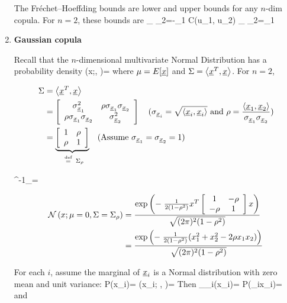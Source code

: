 \begin{enumerate}
The Fréchet–Hoeffding bounds
are lower and upper bounds
for any $n$-dim copula.
For $n=2$, these bounds are
\beq
{}_
{\rvx_2=-\alp \rvx_1}
\leq C(u_1, u_2)\leq
{}_{
\rvx_2=\alp\rvx_1}
\eeq

\item {\bf Gaussian copula}

Recall that the $n$-dimensional
multivariate Normal Distribution
has a probability density
\beq
\caln(x;\mu, \Sigma)=
{}
\eeq
where $\mu= E[{\underline{x}}]$ and
$\Sigma = \left\langle{\underline{x}}^T, {\underline{x}}\right\rangle$.
For $n=2$,

\begin{align}
\Sigma&=
\left\langle{\underline{x}}^T, {\underline{x}}\right\rangle
\\
&=
\left[
\begin{array}{cc}
\sigma_{{\underline{x}}_1}^2
&\rho \sigma_{{\underline{x}}_1}\sigma_{{\underline{x}}_2}
\\
\rho \sigma_{{\underline{x}}_1}\sigma_{{\underline{x}}_2}
&\sigma_{{\underline{x}}_2}^2
\end{array}
\right]
\quad (\sigma_{{\underline{x}}_i} = \sqrt{\left\langle{\underline{x}}_i, {\underline{x}}_i\right\rangle}
\text{ and } \rho  = \frac{\left\langle{\underline{x}}_1, {\underline{x}}_2\right\rangle}{\sigma_{{\underline{x}}_1}\sigma_{{\underline{x}}_2}})
\\
&=
\underbrace{
\left[
\begin{array}{cc}
1
&\rho
\\
\rho
&1
\end{array}
\right]}_{\;\;\stackrel{\text{def}}{=}\;\; \Sigma_\rho}
\quad(\text{Assume }
\sigma_{{\underline{x}}_1}=\sigma_{{\underline{x}}_2}=1)
\end{align}

\beq
\Sigma^{-1}_\rho=
\eeq


\begin{align}
{\cal N}\left(x; \mu=0, \Sigma=
\Sigma_\rho
\right)
&=
\frac{
\exp\left(
-\;\frac{1}{2(1-\rho^2)}x^T
\left[
\begin{array}{cc}
1&-\rho
\\
-\rho&1
\end{array}
\right]x
\right)}
{\sqrt{(2\pi)^2(1-\rho^2)}}
\\
&=
\frac{
\exp\left(
-\;\frac{1}{2(1-\rho^2)}
(x_1^2 + x_2^2-
2\rho x_1 x_2)
\right)}
{\sqrt{(2\pi)^2(1-\rho^2)}}
\end{align}

For each $i$,
assume the marginal
of ${\underline{x}}_i$ is a  Normal
distribution with zero mean and
unit variance:
\beq
P(x_i)= \caln(x_i; , )=
\eeq
Then 
\beq
\Phi_{\rvx_i}(x_i)=
P(\rvx_i\leq x_i)=
\eeq
and


\end{enumerate}

